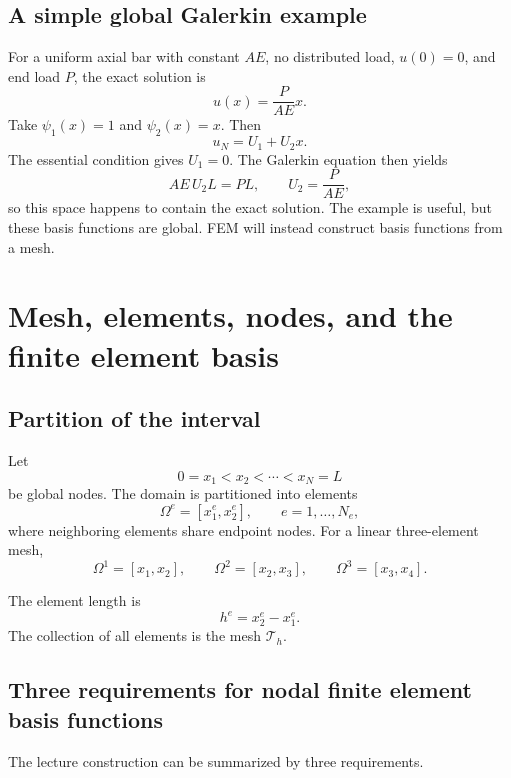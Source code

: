 \documentclass[11pt]{article}
\newcommand{\Om}{\Omega}
\newcommand{\Th}{\mathcal{T}_h}
\begin{document}
\subsection*{A simple global Galerkin example}

For a uniform axial bar with constant $AE$, no distributed load, $u(0)=0$,
and end load $P$, the exact solution is
\[
u(x)=\frac{P}{AE}x.
\]
Take $\psi_1(x)=1$ and $\psi_2(x)=x$. Then
\[
u_N=U_1+U_2x.
\]
The essential condition gives $U_1=0$. The Galerkin equation then yields
\[
AE\,U_2L=PL,
\qquad
U_2=\frac{P}{AE},
\]
so this space happens to contain the exact solution. The example is useful,
but these basis functions are global. FEM will instead construct basis
functions from a mesh.

\section{Mesh, elements, nodes, and the finite element basis}

\subsection{Partition of the interval}

Let
\[
0=x_1<x_2<\cdots<x_N=L
\]
be global nodes. The domain is partitioned into elements
\[
\Om^e=[x_1^e,x_2^e],\qquad e=1,\ldots,N_e,
\]
where neighboring elements share endpoint nodes. For a linear three-element
mesh,
\[
\Om^1=[x_1,x_2],\qquad
\Om^2=[x_2,x_3],\qquad
\Om^3=[x_3,x_4].
\]

\begin{center}
\end{center}

The element length is
\[
h^e=x_2^e-x_1^e.
\]
The collection of all elements is the mesh $\Th$.

\subsection{Three requirements for nodal finite element basis functions}

The lecture construction can be summarized by three requirements.
\end{document}
